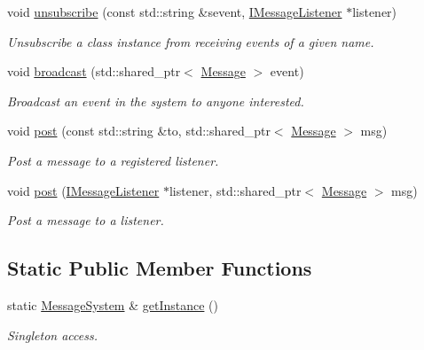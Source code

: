 \begin{DoxyCompactItemize}
void \hyperlink{class_message_system_a68fdb778ec79f4ddf25561d0e39b1c00}{unsubscribe} (const std\+::string \&sevent, \hyperlink{class_i_message_listener}{I\+Message\+Listener} $\ast$listener)
\begin{DoxyCompactList}\small\item\em Unsubscribe a class instance from receiving events of a given name. \end{DoxyCompactList}\item 
void \hyperlink{class_message_system_a2dc1a1964004d3133caea558b6e05f52}{broadcast} (std\+::shared\+\_\+ptr$<$ \hyperlink{class_message}{Message} $>$ event)
\begin{DoxyCompactList}\small\item\em Broadcast an event in the system to anyone interested. \end{DoxyCompactList}\item 
void \hyperlink{class_message_system_a13765245014da37033b0a3696425708a}{post} (const std\+::string \&to, std\+::shared\+\_\+ptr$<$ \hyperlink{class_message}{Message} $>$ msg)
\begin{DoxyCompactList}\small\item\em Post a message to a registered listener. \end{DoxyCompactList}\item 
void \hyperlink{class_message_system_a435432c27003a5d62b4a85811740cc33}{post} (\hyperlink{class_i_message_listener}{I\+Message\+Listener} $\ast$listener, std\+::shared\+\_\+ptr$<$ \hyperlink{class_message}{Message} $>$ msg)
\begin{DoxyCompactList}\small\item\em Post a message to a listener. \end{DoxyCompactList}\end{DoxyCompactItemize}
\subsection*{Static Public Member Functions}
\begin{DoxyCompactItemize}
\item 
static \hyperlink{class_message_system}{Message\+System} \& \hyperlink{class_message_system_a90338799a15b484765c4a8b94d140648}{get\+Instance} ()
\begin{DoxyCompactList}\small\item\em Singleton access. \end{DoxyCompactList}\end{DoxyCompactItemize}

